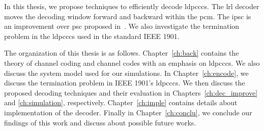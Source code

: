In this thesis, we propose techniques to efficiently decode \glspl{ldpccc}. The \gls{lrl} decoder moves the decoding window forward and backward within the \gls{pcm}. The \gls{ipsc} is an improvement over \gls{psc} proposed in~\cite{Kang2018}. We also investigate the termination problem in the \glspl{ldpccc} used in the standard IEEE 1901.

The organization of this thesis is as follows. Chapter~\ref{ch:back} contains the theory of channel coding and channel codes with an emphasis on \glspl{ldpccc}. We also discuss the system model used for our simulations. In Chapter~\ref{ch:encode}, we discuss the termination problem in IEEE 1901's \glspl{ldpccc}. We then discuss the proposed decoding techniques and their evaluation in Chapters~\ref{ch:dec_improve} and \ref{ch:simulation}, respectively. Chapter~\ref{ch:imple} contains details about implementation of the decoder. Finally in Chapter~\ref{ch:conclu}, we conclude our findings of this work and discuss about possible future works.